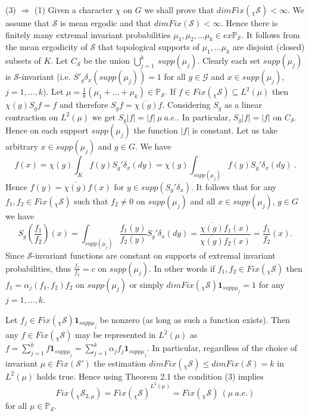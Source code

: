 \documentclass{amsart}
\theoremstyle{definition}
\theoremstyle{remark}
\numberwithin{equation}{section}
\begin{document}
(3) $ \Rightarrow$ (1)
Given a character $\chi $ on $G$ we shall  prove that
$dim Fix(_{\chi}\mathcal{S}) < \infty$. We assume that $\mathcal{S}$
is mean ergodic and that $dim Fix(\mathcal{S}) < \infty$. Hence there is
finitely many  extremal invariant probabilities  $\mu_1, \mu_2, \dots \mu_k
\in ex \mathbb{P}_{\mathcal{S}}$. It follows from the mean ergodicity of $\mathcal{S}$
that topological supports of $\mu_1, \dots \mu_k$ are disjoint (closed) subsets
of $K$. Let $C_{\mathcal{S}}$ be the union $\bigcup_{j=1}^k \ supp(\mu _j)$.
Clearly each set $supp(\mu_j)$ is $\mathcal{S}$-invariant (i.e.
$S'_g \delta_x (supp (\mu_j)) = 1$ for all $g\mathcal{\in G}$ and $x\in supp(\mu_j)$,
$j =1, ... , k$). Let $\mu = \frac{1}{k}(\mu_1 + ... + \mu_k) \in \mathbb{P}_{\mathcal{S}}$.
If $f\in Fix(_{\chi}\mathcal{S})\subseteq L^2(\mu )$ then $\chi(g)S_gf = f $ and
therefore $S_gf = \overline{\chi(g)}f$. Considering $S_g$ as a linear contraction on $L^2(\mu )$
we get $S_g|f| = |f| \ \mu \ a.e.$. In particular, $S_g|f| = |f|$ on  $C_{\mathcal{S}}$.
Hence on each support $supp(\mu_j)$ the function $|f|$ is constant.
Let us take arbitrary $x\in supp(\mu_j)$  and $g\in G$. We have
$$
f(x) =  \chi(g)\int_K f(y) S_g'\delta_x(dy) = \chi(g)\int_{supp(\mu_j)} f(y) S_g'\delta_x(dy) \ .
$$
Hence $f(y) = \overline{\chi(g)}f(x)$ for $y \in supp(S_g'\delta_x)$.
It follows that for  any $f_1, f_2 \in Fix(_{\chi}\mathcal{S})$ such that
$f_2 \neq 0$ on $supp(\mu_j)$ and all $x\in supp(\mu_j)$, $g\in G$ we have
$$
S_g\left(\frac{f_1}{f_2}\right) (x) = \int_{supp(\mu_j)} \frac{f_1(y)}{f_2(y)} S_g'\delta_x(dy) =
\frac{\overline{\chi(g)}f_1(x)}{\overline{\chi(g)}f_2(x)} = \frac{f_1}{f_2}(x).
$$
Since $\mathcal{S}$-invariant functions are constant on supports of extremal
invariant probabilities, thus $\frac{f_1}{f_2} = c$ on $supp(\mu_j)$. In other words if
$f_1, f_2 \in Fix(_{\chi}\mathcal{S})$ then $f_1 = \alpha_j(f_1, f_2)f_2$ on $supp(\mu_j)$ or simply
$dim Fix(_{\chi}\mathcal{S})\mathbf{1}_{supp \mu_j} = 1$ for any $j = 1, ... , k$.


Let $f_j\in Fix(_{\chi}\mathcal{S})\mathbf{1}_{supp \mu_j}$ be nonzero (as long as such a function
exists). Then any
$f\in Fix(_{\chi}\mathcal{S})$ may be represented  in  $L^2(\mu)$ as
$f = \sum_{j=1}^k f \mathbf{1}_{supp \mu_j} = \sum_{j=1}^k \alpha_jf_j\mathbf{1}_{supp \mu_j}$.
In particular, regardless of the choice of invariant $\mu \in Fix(\mathcal{S}')$ the estimation
$dim Fix(_{\chi}\mathcal{S}) \leq dim Fix(\mathcal{S}) = k $ in $L^2(\mu )$ holds true.
Hence using Theorem 2.1 the condition (3) implies
$$
Fix(_{\chi}\mathcal{S}_{2,\mu}) = \overline{Fix(_{\chi}\mathcal{S})}^{L^2(\mu)} = Fix(_{\chi}\mathcal{S}) \
(\mu \ a.e.)
$$
for all $\mu \in \mathbb{P}_{\mathcal{S}}$.
\end{document}
